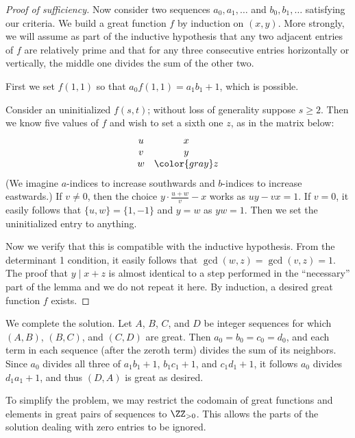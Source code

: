 \documentclass[11pt]{scrartcl}
\begin{document}
\begin{proof}[Proof of sufficiency]
  Now consider two sequences $a_0, a_1, \dots$
  and $b_0, b_1, \dots$ satisfying our criteria.
  We build a great function $f$ by induction on $(x, y)$.
  More strongly, we will assume as part of the inductive hypothesis
  that any two adjacent entries of $f$ are relatively prime
  and that for any three consecutive entries horizontally or vertically,
  the middle one divides the sum of the other two.

  First we set $f(1, 1)$ so that $a_0 f(1, 1) = a_1 b_1 + 1$,
  which is possible.

  Consider an uninitialized $f(s, t)$;
  without loss of generality suppose $s \ge 2$.
  Then we know five values of $f$
  and wish to set a sixth one $z$,
  as in the matrix below:
  \[
    \begin{matrix}
    u & x\\
    v & y\\
    w & {\color{gray} z} \\
    \end{matrix}
  \]
  (We imagine $a$-indices to increase southwards and $b$-indices to increase eastwards.)
  If $v \neq 0$,
  then the choice $y \cdot \frac{u + w}{v} - x$ works
  as $uy - vx = 1$.
  If $v = 0$,
  it easily follows that $\{u, w\} = \{1, -1\}$
  and $y = w$ as $yw = 1$.
  Then we set the uninitialized entry to anything.

  Now we verify that this is compatible with the inductive hypothesis.
  From the determinant 1 condition,
  it easily follows that $\gcd(w, z) = \gcd(v, z) = 1$.
  The proof that $y \mid x + z$
  is almost identical to a step performed in the ``necessary'' part
  of the lemma and we do not repeat it here.
  By induction, a desired great function $f$ exists.
\end{proof}

We complete the solution.
Let $A$, $B$, $C$, and $D$ be integer sequences
for which $(A, B)$, $(B, C)$, and $(C, D)$ are great.
Then $a_0 = b_0 = c_0 = d_0$,
and each term in each sequence
(after the zeroth term)
divides the sum of its neighbors.
Since $a_0$ divides all three of $a_1b_1 + 1$, $b_1c_1 + 1$, and $c_1d_1 + 1$,
it follows $a_0$ divides $d_1a_1 + 1$,
and thus $(D, A)$ is great as desired.

\begin{remark*}
To simplify the problem,
we may restrict the codomain of great functions
and elements in great pairs of sequences
to $\ZZ_{> 0}$.
This allows the parts of the solution dealing with zero entries to be ignored.
\end{remark*}
\end{document}
